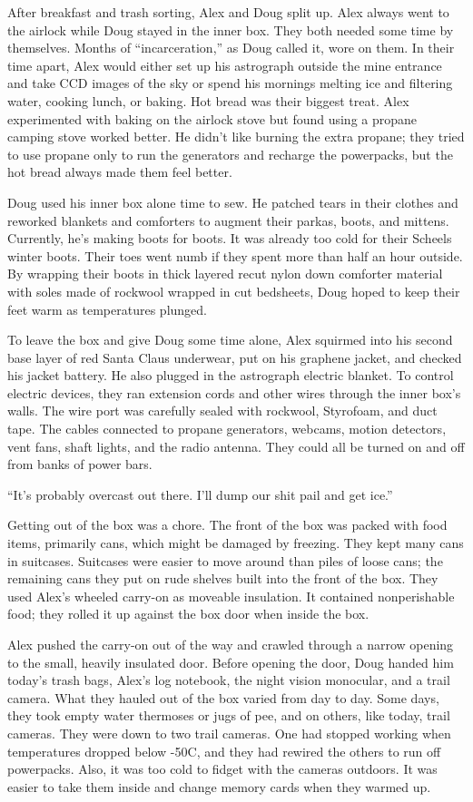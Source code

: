After breakfast and trash sorting, Alex and Doug split up. Alex always
went to the airlock while Doug stayed in the inner box. They both needed
some time by themselves. Months of ``incarceration,'' as Doug called it,
wore on them. In their time apart, Alex would either set up his
astrograph outside the mine entrance and take CCD images of the sky or
spend his mornings melting ice and filtering water, cooking lunch, or
baking. Hot bread was their biggest treat. Alex experimented with baking
on the airlock stove but found using a propane camping stove worked
better. He didn't like burning the extra propane; they tried to use
propane only to run the generators and recharge the powerpacks, but the
hot bread always made them feel better.

Doug used his inner box alone time to sew. He patched tears in their
clothes and reworked blankets and comforters to augment their parkas,
boots, and mittens. Currently, he's making boots for boots. It was
already too cold for their Scheels winter boots. Their toes went numb if
they spent more than half an hour outside. By wrapping their boots in
thick layered recut nylon down comforter material with soles made of
rockwool wrapped in cut bedsheets, Doug hoped to keep their feet warm as
temperatures plunged.

To leave the box and give Doug some time alone, Alex squirmed into his
second base layer of red Santa Claus underwear, put on his graphene
jacket, and checked his jacket battery. He also plugged in the
astrograph electric blanket. To control electric devices, they ran
extension cords and other wires through the inner box's walls. The wire
port was carefully sealed with rockwool, Styrofoam, and duct tape. The
cables connected to propane generators, webcams, motion detectors, vent
fans, shaft lights, and the radio antenna. They could all be turned on
and off from banks of power bars.

``It's probably overcast out there. I'll dump our shit pail and get
ice.''

Getting out of the box was a chore. The front of the box was packed with
food items, primarily cans, which might be damaged by freezing. They
kept many cans in suitcases. Suitcases were easier to move around than
piles of loose cans; the remaining cans they put on rude shelves built
into the front of the box. They used Alex's wheeled carry-on as moveable
insulation. It contained nonperishable food; they rolled it up against
the box door when inside the box.

Alex pushed the carry-on out of the way and crawled through a narrow
opening to the small, heavily insulated door. Before opening the door,
Doug handed him today's trash bags, Alex's log notebook, the night
vision monocular, and a trail camera. What they hauled out of the box
varied from day to day. Some days, they took empty water thermoses or
jugs of pee, and on others, like today, trail cameras. They were down to
two trail cameras. One had stopped working when temperatures dropped
below -50C, and they had rewired the others to run off powerpacks. Also,
it was too cold to fidget with the cameras outdoors. It was easier to
take them inside and change memory cards when they warmed up.

